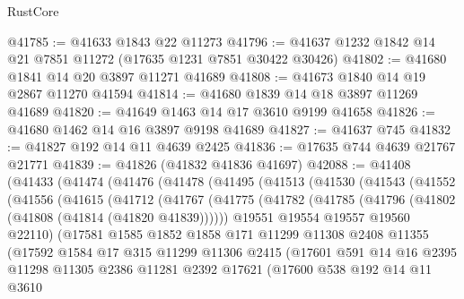 \begin{lexlean}{RustCore}
\begin{coremodule}
@41785 := @41633 @1843 @22 @11273
@41796 := @41637 @1232 @1842 @14 @21 @7851 @11272 (@17635 @1231 @7851 @30422 @30426)
@41802 := @41680 @1841 @14 @20 @3897 @11271 @41689
@41808 := @41673 @1840 @14 @19 @2867 @11270 @41594
@41814 := @41680 @1839 @14 @18 @3897 @11269 @41689
@41820 := @41649 @1463 @14 @17 @3610 @9199 @41658
@41826 := @41680 @1462 @14 @16 @3897 @9198 @41689
@41827 := @41637 @745
@41832 := @41827 @192 @14 @11 @4639 @2425
@41836 := @17635 @744 @4639 @21767 @21771
@41839 := @41826 (@41832 @41836 @41697)
@42088 := @41408
    (@41433
      (@41474
        (@41476
          (@41478
            (@41495
              (@41513
                (@41530
                  (@41543
                    (@41552
                      (@41556
                        (@41615
                          (@41712
                            (@41767
                              (@41775
                                (@41782
                                  (@41785 (@41796 (@41802 (@41808 (@41814 (@41820 @41839))))))
                                  @19551
                                  @19554
                                  @19557
                                  @19560
                                  @22110)
                                (@17581
                                  @1585
                                  @1852
                                  @1858
                                  @171
                                  @11299
                                  @11308
                                  @2408
                                  @11355
                                  (@17592
                                    @1584
                                    @17
                                    @315
                                    @11299
                                    @11306
                                    @2415
                                    (@17601
                                      @591
                                      @14
                                      @16
                                      @2395
                                      @11298
                                      @11305
                                      @2386
                                      @11281
                                      @2392
                                      @17621
                                      (@17600
                                        @538
                                        @192
                                        @14
                                        @11
                                        @3610

\end{coremodule}
\end{lexlean}
